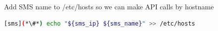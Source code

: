 Add SMS name to /etc/hosts so we can make API calls by hostname
\begin{lstlisting}[language=bash,keywords={}]
[sms](*\#*) echo "${sms_ip} ${sms_name}" >> /etc/hosts
\end{lstlisting}
